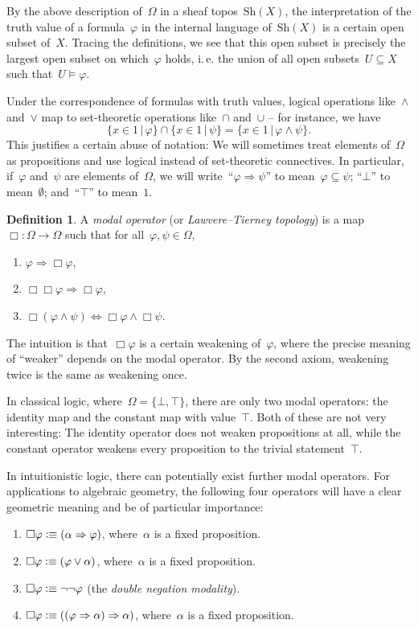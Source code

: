 \documentclass[10pt,reqno,a4paper]{amsbook}
\makeatletter
\theoremstyle{definition}
\newtheorem{defn}{Definition}[section]
\theoremstyle{plain}
\theoremstyle{remark}
\newcommand{\Sh}{\mathrm{Sh}}
\newcommand{\?}{\,{:}\,}
\renewcommand{\_}{\mathpunct{.}\,}
\newcommand{\ie}{i.\,e.\@\xspace}
\newcommand{\defequiv}{\vcentcolon\equiv}
\makeatother
\begin{document}
By the above description of~$\Omega$ in
a sheaf topos~$\Sh(X)$, the interpretation of the truth value
of a formula~$\varphi$ in the internal language of~$\Sh(X)$ is a certain open
subset of~$X$. Tracing the definitions, we see that this open subset is
precisely the largest open subset on which~$\varphi$ holds, \ie the union of
all open subsets~$U \subseteq X$ such that~$U \models \varphi$.

Under the correspondence of formulas with truth values, logical operations
like~$\wedge$ and~$\vee$ map to set-theoretic operations like~$\cap$ and~$\cup$
-- for instance, we have
\[ \{ x \in 1 \,|\, \varphi \} \cap \{ x \in 1 \,|\, \psi \} =
  \{ x \in 1 \,|\, \varphi \wedge \psi \}. \]
This justifies a certain abuse of notation: We will sometimes treat elements
of~$\Omega$ as propositions and use logical instead of set-theoretic
connectives. In particular, if~$\varphi$ and~$\psi$ are elements of~$\Omega$,
we will write~``$\varphi \Rightarrow \psi$'' to mean~$\varphi \subseteq \psi$;
``$\bot$'' to mean~$\emptyset$; and~``$\top$'' to mean~$1$.

\begin{defn}A \emph{modal operator} (or \emph{Lawvere--Tierney topology}) is a map~$\Box : \Omega \to \Omega$ such
that for all~$\varphi, \psi \in \Omega$,
\begin{enumerate}
\item $\varphi \Longrightarrow \Box\varphi$,
\item $\Box\Box\varphi \Longrightarrow \Box\varphi$,
\item $\Box(\varphi \wedge \psi) \Longleftrightarrow \Box\varphi \wedge \Box\psi$.
\end{enumerate}
\end{defn}

The intuition is that~$\Box\varphi$ is a certain weakening of~$\varphi$, where
the precise meaning of ``weaker'' depends on the modal operator. By the second
axiom, weakening twice is the same as weakening once.

In classical logic, where~$\Omega = \{ \bot, \top \}$, there are only two modal
operators: the identity map and the constant map with value~$\top$.
Both of these are not very interesting: The identity operator does not weaken
propositions at all, while the constant operator weakens every proposition to
the trivial statement~$\top$.

In intuitionistic logic, there can potentially exist further modal operators.
For applications to algebraic geometry, the following four operators will have
a clear geometric meaning and be of particular importance:
\begin{enumerate}
\item $\Box\varphi \defequiv (\alpha \Rightarrow \varphi)$, where~$\alpha$ is a
fixed proposition.
\item $\Box\varphi \defequiv (\varphi \vee \alpha)$, where~$\alpha$ is a
fixed proposition.
\item $\Box\varphi \defequiv \neg\neg\varphi$ (the \emph{double negation
modality}).
\item $\Box\varphi \defequiv ((\varphi \Rightarrow \alpha) \Rightarrow \alpha)$,
where~$\alpha$ is a fixed proposition.
\end{enumerate}
\end{document}
